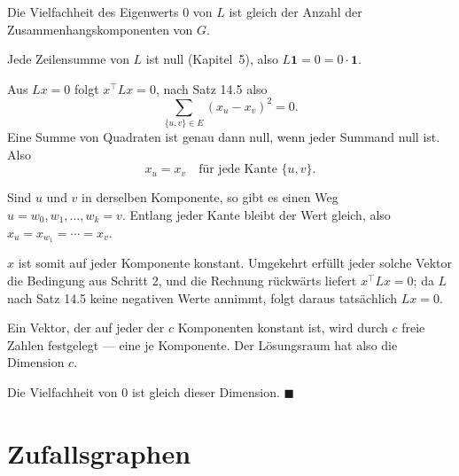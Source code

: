 \begin{merksatz}
Die Vielfachheit des Eigenwerts $0$ von $L$ ist gleich der Anzahl der Zusammenhangskomponenten von $G$.

Jede Zeilensumme von $L$ ist null (Kapitel~5), also $L\mathbf{1} = 0 = 0 \cdot \mathbf{1}$.

Aus $Lx = 0$ folgt $x^{\!\top}Lx = 0$, nach Satz 14.5 also
\[ \sum_{\{u,v\}\in E}(x_u - x_v)^2 = 0 . \]
Eine Summe von Quadraten ist genau dann null, wenn jeder Summand null ist. Also
\[ x_u = x_v \quad \text{für jede Kante } \{u,v\} . \]

Sind $u$ und $v$ in derselben Komponente, so gibt es einen Weg $u = w_0, w_1, \ldots, w_k = v$. Entlang jeder Kante bleibt der Wert gleich, also $x_u = x_{w_1} = \cdots = x_v$.

$x$ ist somit auf jeder Komponente konstant. Umgekehrt erfüllt jeder solche Vektor die Bedingung aus Schritt 2, und die Rechnung rückwärts liefert $x^{\!\top}Lx=0$; da $L$ nach Satz 14.5 keine negativen Werte annimmt, folgt daraus tatsächlich $Lx=0$.

Ein Vektor, der auf jeder der $c$ Komponenten konstant ist, wird durch $c$ freie Zahlen festgelegt --- eine je Komponente. Der Lösungsraum hat also die Dimension $c$.

Die Vielfachheit von $0$ ist gleich dieser Dimension. $\blacksquare$

\begin{center}
\begin{minipage}{0.88\textwidth}
\end{minipage}
\end{center}
\end{merksatz}

\section{Zufallsgraphen}

